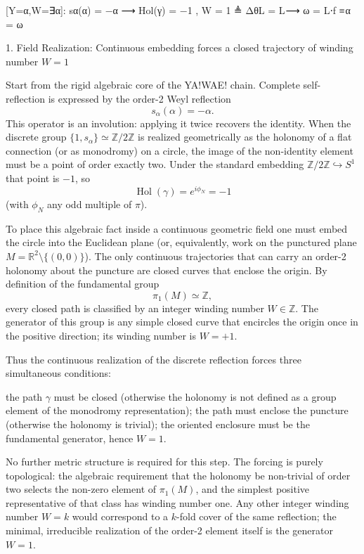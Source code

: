 [Y=α,W=∃α]: sα(α) = −α ⟶  Hol⁡(γ) = −1 , W = 1 ≜ ΔθL = L ⟶ ω = L⋅f ≡ α = ω

1. Field Realization: Continuous embedding forces a closed trajectory of winding number \(W=1\)

Start from the rigid algebraic core of the YA!WAE! chain. Complete self-reflection is expressed by the order-2 Weyl reflection
\[
s_\alpha(\alpha)=-\alpha.
\]
This operator is an involution: applying it twice recovers the identity. When the discrete group \(\{1,s_\alpha\}\simeq\mathbb{Z}/2\mathbb{Z}\) is realized geometrically as the holonomy of a flat connection (or as monodromy) on a circle, the image of the non-identity element must be a point of order exactly two. Under the standard embedding \(\mathbb{Z}/2\mathbb{Z}\hookrightarrow S^1\) that point is \(-1\), so
\[
\operatorname{Hol}(\gamma)=e^{i\phi_N}=-1
\]
(with \(\phi_N\) any odd multiple of \(\pi\)).

To place this algebraic fact inside a continuous geometric field one must embed the circle into the Euclidean plane (or, equivalently, work on the punctured plane \(M=\mathbb{R}^2\setminus\{(0,0)\}\)). The only continuous trajectories that can carry an order-2 holonomy about the puncture are closed curves that enclose the origin. By definition of the fundamental group
\[
\pi_1(M)\simeq\mathbb{Z},
\]
every closed path is classified by an integer winding number \(W\in\mathbb{Z}\). The generator of this group is any simple closed curve that encircles the origin once in the positive direction; its winding number is \(W=+1\).

Thus the continuous realization of the discrete reflection forces three simultaneous conditions:

the path \(\gamma\) must be closed (otherwise the holonomy is not defined as a group element of the monodromy representation);
the path must enclose the puncture (otherwise the holonomy is trivial);
the oriented enclosure must be the fundamental generator, hence \(W=1\).

No further metric structure is required for this step. The forcing is purely topological: the algebraic requirement that the holonomy be non-trivial of order two selects the non-zero element of \(\pi_1(M)\), and the simplest positive representative of that class has winding number one. Any other integer winding number \(W=k\) would correspond to a \(k\)-fold cover of the same reflection; the minimal, irreducible realization of the order-2 element itself is the generator \(W=1\).

